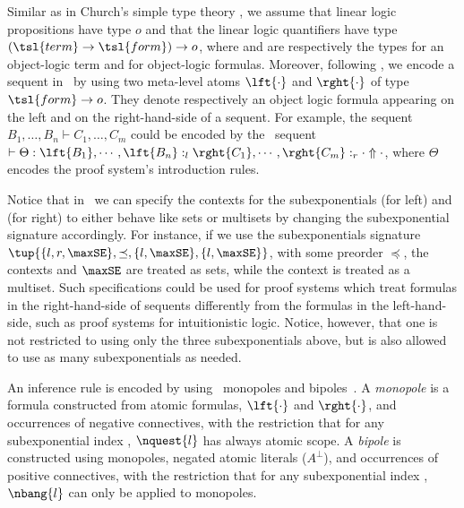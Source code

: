 Similar as in Church's simple type theory \cite{church40}, we assume that 
linear logic propositions
have type $o$ and  that the linear logic quantifiers
have type $(\tsl{term} \rightarrow \tsl{form}) \rightarrow o$, where 
 and  are respectively the types for an
object-logic term and for object-logic formulas. 
Moreover, following \cite{pimentel05lpar,pimentel01phd,nigam10jar}, 
we encode
a sequent in \SELLF\ by using two meta-level atoms $\lft{\cdot}$ and 
$\rght{\cdot}$ of type $\tsl{form} \rightarrow o$. They denote 
respectively an object logic formula appearing on the left and on the 
right-hand-side of a sequent. For example, the sequent 
$B_1, \ldots, B_n \vdash C_1, \ldots, C_m$ could be encoded by 
the \SELLF\ sequent $\vdash \Theta : 
\lft{B_1}, \cdots, \lft{B_n} :_l \rght{C_1}, \cdots, \rght{C_m} :_r \cdot
\Uparrow \cdot$, where $\Theta$ encodes the proof system's
introduction rules. 

Notice that in \SELLF\ we can specify the contexts
for the
subexponentials  (for left) and  (for right) to either 
behave like sets or multisets by changing the subexponential signature 
accordingly. For instance, if we use the subexponentials signature 
$\tup{\{l,r, \maxSE\},\preceq,\{l, \maxSE\}, \{l, \maxSE\}}$, with some
preorder $\preceq$, 
the contexts  and $\maxSE$ are treated as sets, while
the context  is treated as a multiset.
Such specifications could be used for proof systems which treat formulas
in the right-hand-side of sequents differently from the formulas in the
left-hand-side, such as proof systems for intuitionistic logic. 
Notice, however,  that one is not restricted to using only the three
subexponentials above, but is also allowed to use as many
subexponentials as needed.


An inference rule is encoded by using \sellf\ monopoles and
bipoles~\cite{miller.ep}. A \emph{monopole} is a formula constructed from
atomic formulas, $\lft{\cdot}$ and $\rght{\cdot}$, and occurrences of
negative connectives, with the restriction that for any
subexponential index , $\nquest{l}$ has always atomic scope. A
\emph{bipole} is constructed using monopoles, negated atomic literals
($A^\bot$), and
occurrences of positive connectives, with the restriction that for any
subexponential index , $\nbang{l}$ can only be applied to monopoles.

